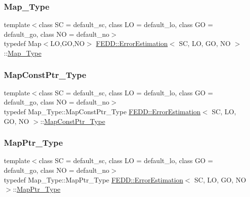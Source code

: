 \subsubsection{\texorpdfstring{Map\+\_\+\+Type}{Map\_Type}}
{\footnotesize\ttfamily template$<$class SC = default\+\_\+sc, class LO = default\+\_\+lo, class GO = default\+\_\+go, class NO = default\+\_\+no$>$ \\
typedef Map$<$LO,GO,NO$>$ \hyperlink{classFEDD_1_1ErrorEstimation}{F\+E\+D\+D\+::\+Error\+Estimation}$<$ SC, LO, GO, NO $>$\+::\hyperlink{classFEDD_1_1ErrorEstimation_a94d0ce98d9e797cc35769bda8d3ef9fc}{Map\+\_\+\+Type}}

\mbox{\label{classFEDD_1_1ErrorEstimation_ad45c898ab6123b9e7d5efbc0e5365ccf}} 
\subsubsection{\texorpdfstring{Map\+Const\+Ptr\+\_\+\+Type}{MapConstPtr\_Type}}
{\footnotesize\ttfamily template$<$class SC = default\+\_\+sc, class LO = default\+\_\+lo, class GO = default\+\_\+go, class NO = default\+\_\+no$>$ \\
typedef Map\+\_\+\+Type\+::\+Map\+Const\+Ptr\+\_\+\+Type \hyperlink{classFEDD_1_1ErrorEstimation}{F\+E\+D\+D\+::\+Error\+Estimation}$<$ SC, LO, GO, NO $>$\+::\hyperlink{classFEDD_1_1ErrorEstimation_ad45c898ab6123b9e7d5efbc0e5365ccf}{Map\+Const\+Ptr\+\_\+\+Type}}

\mbox{\label{classFEDD_1_1ErrorEstimation_aaa2f9c22726907f5403cdeb0261b67fd}} 
\subsubsection{\texorpdfstring{Map\+Ptr\+\_\+\+Type}{MapPtr\_Type}}
{\footnotesize\ttfamily template$<$class SC = default\+\_\+sc, class LO = default\+\_\+lo, class GO = default\+\_\+go, class NO = default\+\_\+no$>$ \\
typedef Map\+\_\+\+Type\+::\+Map\+Ptr\+\_\+\+Type \hyperlink{classFEDD_1_1ErrorEstimation}{F\+E\+D\+D\+::\+Error\+Estimation}$<$ SC, LO, GO, NO $>$\+::\hyperlink{classFEDD_1_1ErrorEstimation_aaa2f9c22726907f5403cdeb0261b67fd}{Map\+Ptr\+\_\+\+Type}}

